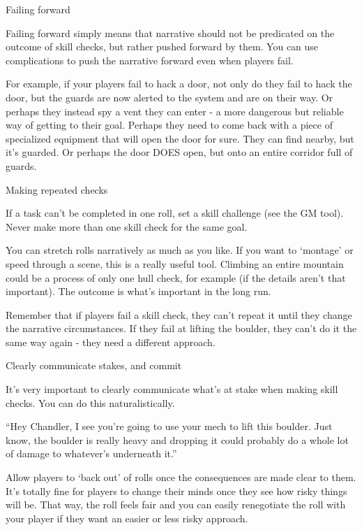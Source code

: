                                               Failing forward
 

Failing forward simply means that narrative should not be predicated on the outcome of skill  
checks, but rather pushed forward by them. You can use complications to push the narrative  
forward even when players fail.  

For example, if your players fail to hack a door, not only do they fail to hack the door, but the  
guards are now alerted to the system and are on their way. Or perhaps they instead spy a vent  
they can enter - a more dangerous but reliable way of getting to their goal. Perhaps they need to  
come back with a piece of specialized equipment that will open the door for sure. They can find  
nearby, but it’s guarded. Or perhaps the door DOES open, but onto an entire corridor full of  
guards.
 

                                         Making repeated checks  

If a task can’t be completed in one roll, set a skill challenge (see the GM tool). Never make more  
than one skill check for the same goal.
 

You can stretch rolls narratively as much as you like. If you want to ‘montage’ or speed through a  
scene, this is a really useful tool. Climbing an entire mountain could be a process of only one hull  
check, for example (if the details aren’t that important). The outcome is what’s important in the  
long run.
 

Remember that if players fail a skill check, they can’t repeat it until they change the  
narrative circumstances. If they fail at lifting the boulder, they can’t do it the same way again -  
they need a different approach.
 

                              Clearly communicate stakes, and commit
 

It’s very important to clearly communicate what’s at stake when making skill checks. You can  
do this naturalistically.
 
	        “Hey Chandler, I see you’re going to use your mech to lift this boulder. Just know, the  
boulder is really heavy and dropping it could probably do a whole lot of damage to whatever’s  
underneath it.”
 

                                                                                                            


Allow players to ‘back out’ of rolls once the consequences are made clear to them. It’s totally  
fine for players to change their minds once they see how risky things will be. That way, the roll  
feels fair and you can easily renegotiate the roll with your player if they want an easier or less  
risky approach.
 

